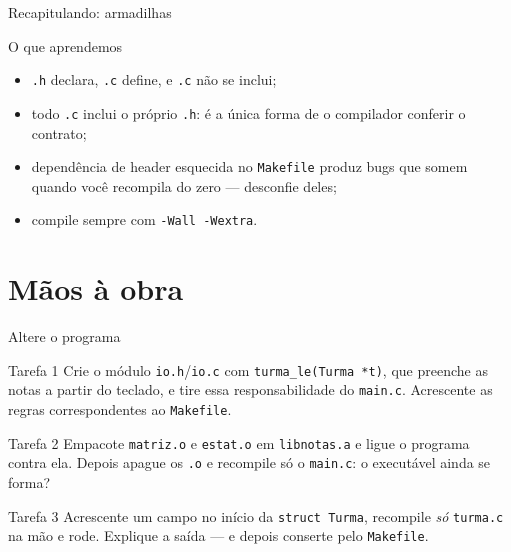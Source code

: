 \documentclass[aspectratio=169]{beamer}
\begin{document}
\begin{frame}{Recapitulando: armadilhas}
  \begin{block}{O que aprendemos}
    \begin{itemize}
      \item \texttt{.h} declara, \texttt{.c} define, e \texttt{.c} não se
        inclui;
      \item todo \texttt{.c} inclui o próprio \texttt{.h}: é a única forma de
        o compilador conferir o contrato;
      \item dependência de header esquecida no \texttt{Makefile} produz
        bugs que somem quando você recompila do zero --- desconfie deles;
      \item compile sempre com \texttt{-Wall -Wextra}.
    \end{itemize}
  \end{block}
\end{frame}

\section{Mãos à obra}

\begin{frame}{Altere o programa}
  \begin{block}{Tarefa 1}
    Crie o módulo \texttt{io.h}/\texttt{io.c} com
    \texttt{turma\_le(Turma *t)}, que preenche as notas a partir do teclado, e
    tire essa responsabilidade do \texttt{main.c}. Acrescente as regras
    correspondentes ao \texttt{Makefile}.
  \end{block}
  \begin{block}{Tarefa 2}
    Empacote \texttt{matriz.o} e \texttt{estat.o} em \texttt{libnotas.a} e
    ligue o programa contra ela. Depois apague os \texttt{.o} e recompile só o
    \texttt{main.c}: o executável ainda se forma?
  \end{block}
  \begin{block}{Tarefa 3}
    Acrescente um campo no início da \texttt{struct Turma}, recompile
    \emph{só} \texttt{turma.c} na mão e rode. Explique a saída --- e
    depois conserte pelo \texttt{Makefile}.
  \end{block}
\end{frame}
\end{document}
